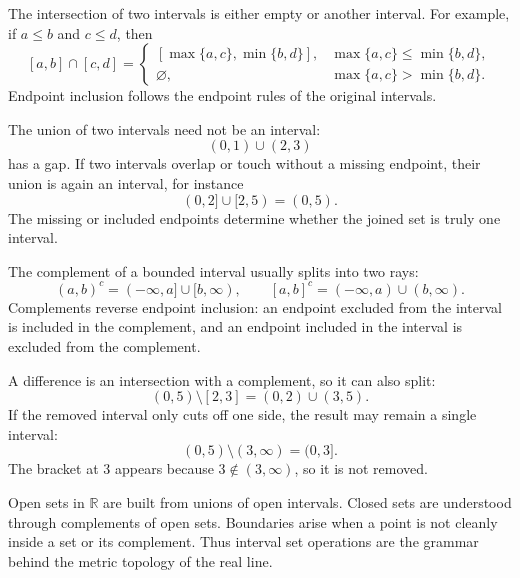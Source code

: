 \begin{remark*}
The intersection of two intervals is either empty or another interval. For
example, if $a\leq b$ and $c\leq d$, then
\[
[a,b]\cap[c,d]
=
\begin{cases}
[\max\{a,c\},\min\{b,d\}], & \max\{a,c\}\leq \min\{b,d\},\\
\varnothing, & \max\{a,c\}>\min\{b,d\}.
\end{cases}
\]
Endpoint inclusion follows the endpoint rules of the original intervals.
\end{remark*}

\begin{remark*}
The union of two intervals need not be an interval:
\[
(0,1)\cup(2,3)
\]
has a gap. If two intervals overlap or touch without a missing endpoint, their
union is again an interval, for instance
\[
(0,2]\cup[2,5)=(0,5).
\]
The missing or included endpoints determine whether the joined set is truly
one interval.
\end{remark*}

\begin{remark*}
The complement of a bounded interval usually splits into two rays:
\[
(a,b)^c=(-\infty,a]\cup[b,\infty),
\qquad
[a,b]^c=(-\infty,a)\cup(b,\infty).
\]
Complements reverse endpoint inclusion: an endpoint excluded from the interval
is included in the complement, and an endpoint included in the interval is
excluded from the complement.
\end{remark*}

\begin{remark*}
A difference is an intersection with a complement, so it can also split:
\[
(0,5)\setminus[2,3]=(0,2)\cup(3,5).
\]
If the removed interval only cuts off one side, the result may remain a single
interval:
\[
(0,5)\setminus(3,\infty)=(0,3].
\]
The bracket at $3$ appears because $3\notin(3,\infty)$, so it is not removed.
\end{remark*}

\begin{remark*}
Open sets in $\mathbb{R}$ are built from unions of open intervals. Closed sets
are understood through complements of open sets. Boundaries arise when a point
is not cleanly inside a set or its complement. Thus interval set operations are
the grammar behind the metric topology of the real line.
\end{remark*}
